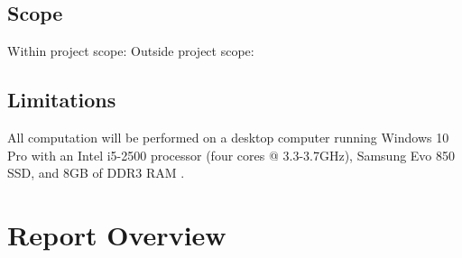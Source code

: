 \subsection{Scope}
Within project scope:
Outside project scope:
\subsection{Limitations}
All computation will be performed on a desktop computer running Windows 10 Pro with an Intel i5-2500 processor (four cores @ 3.3-3.7GHz), Samsung Evo 850 SSD, and 8GB of DDR3 RAM .




\section{Report Overview}


